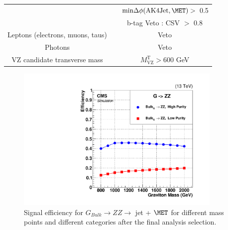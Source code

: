 \begin{table}[h]
\begin{footnotesize}
\begin{tabular}{|c|cc|}
                                       &                                       &      $\text{min}\Delta \phi(\text{AK4Jet},\MET) >$ 0.5             \\
                                       &                                       &      b-tag Veto : CSV $>$ 0.8 
 
                           \\  \cline{1-3}
Leptons (electrons, muons, taus)                                &                                       &      Veto                                                        \\  \cline{1-3}
Photons                                &                                       &      Veto                                                      \\ \cline{1-3}
VZ candidate transverse mass           &                                       &      $M^{\text{T}}_{\text{VZ}} > 600$ GeV                      \\ \cline{1-3}
\end{tabular}
\end{footnotesize} 
\end{table}

\begin{figure}[!ht]
\caption{ Signal efficiency for $G_{Bulk} \rightarrow ZZ \rightarrow $ jet + $\MET$ for different mass points and different categories after the final analysis selection.}
\begin{center}
  \includegraphics[width=280pt]{figuresARC/sigeff/efficiency.pdf}
\end{center}
\label{fig:eff}
\end{figure}



